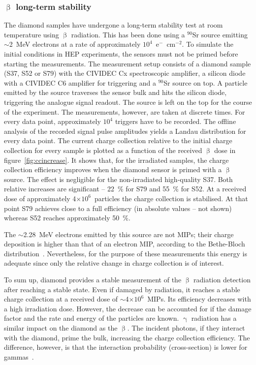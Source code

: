 \subsubsection{$\upbeta$ long-term stability}
The diamond samples have undergone a long-term stability test at room temperature using $\upbeta$ radiation. This has been done using a $^{90}$Sr source emitting $\sim$2~MeV electrons at a rate of approximately $10^4$~e$^-$~cm$^{-2}$. To simulate the initial conditions in HEP experiments, the sensors must not be primed before starting the measurements. The measurement setup consists of a diamond sample (S37, S52 or S79) with the CIVIDEC Cx spectroscopic amplifier, a silicon diode with a CIVIDEC C6 amplifier for triggering and a $^{90}$Sr source on top. A particle emitted by the source traverses the sensor bulk and hits the silicon diode, triggering the analogue signal readout. The source is left on the top for the course of the experiment. The measurements, however, are taken at discrete times. For every data point, approximately $10^4$ triggers have to be recorded. The offline analysis of the recorded signal pulse amplitudes yields a Landau distribution for every data point. The current charge collection relative to the initial charge collection for every sample is plotted as a function of the received $\upbeta$ dose in figure~\ref{fig:ccincrease}. It shows that, for the irradiated samples, the charge collection efficiency improves when the diamond sensor is primed with a $\upbeta$ source. The effect is negligible for the non-irradiated high-quality S37. Both relative increases are significant -- 22~\% for S79 and 55~\% for S52. At a received dose of approximately 4$\times10^6$~particles the charge collection is stabilised. At that point S79 achieves close to a full efficiency (in absolute values -- not shown) whereas S52 reaches approximately 50~\%.

The $\sim$2.28~MeV electrons emitted by this source are not MIPs; their charge deposition is higher than that of an electron MIP, according to the Bethe-Bloch distribution~\cite{BETHE:00000}. Nevertheless, for the purpose of these measurements this energy is adequate since only the relative change in charge collection is of interest.

To sum up, diamond provides a stable measurement of the $\upbeta$ radiation detection after reaching a stable state. Even if damaged by radiation, it reaches a stable charge collection at a received dose of $\sim$4$\times10^6$~MIPs. Its efficiency decreases with a high irradiation dose. %
However, the decrease can be accounted for if the damage factor and the rate and energy of the particles are known. $\upgamma$ radiation has a similar impact on the diamond as the $\upbeta$. The incident photons, if they interact with the diamond, prime the bulk, increasing the charge collection efficiency. The difference, however, is that the interaction probability (cross-section) is lower for gammas~\cite{sarin2014comprehensive,Griesmayer20121997}.

